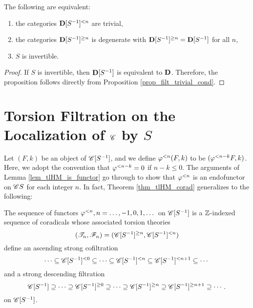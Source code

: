 \begin{prop}
The following are equivalent:
\begin{enumerate}
\item the categories $\Corad{n}{\DCatLoc{S}}$ are trivial,

\item the categories $\Prerad{n}{\DCatLoc{S}}$ is degenerate with
$\Prerad{n}{\DCatLoc{S}} = \DCatLoc{S}$ for all $n$,

\item $S$ is invertible.
\end{enumerate}
\end{prop}
\begin{proof}
If $S$ is invertible, then $\DCatLoc{S}$ is equivalent to $\DCat$.
Therefore, the proposition follows directly from Proposition
\ref{prop_filt_trivial_cond}.
\end{proof}

\section{Torsion Filtration on the Localization of $\Cat{C}$ by $S$}

Let $(F, k)$ be an object of $\CatLoc{C}{S}$, and we define
$\corad{n}(F, k)$ to be $(\corad{n - k}F, k)$. Here, we 
adopt the convention that $\corad{n - k} = 0$ if $n - k \leq 0$.
The arguments of Lemma \ref{lem_tlHM_is_functor} go through to
show that $\corad{n}$ is an endofunctor on $\Cat{C}{S}$ for each
integer $n$. In fact, Theorem \ref{thm_tlHM_corad} generalizes to
the following:

\begin{thm}
\label{thm_sum_heart_loc}
The sequence of functors $\corad{n}, n = \dots, -1, 0, 1, \dots$ on
$\CatLoc{C}{S}$ is a $\Z$-indexed sequence of coradicals whose 
associated torsion theories 
\[
(\Cat{T}_n, \Cat{F}_n) = (\Prerad{n}{\CatLoc{C}{S}}, \Corad{n}{\CatLoc{C}{S}})
\]
define an ascending strong cofiltration
\[
\cdots \subseteq \Corad{0}{\CatLoc{C}{S}} \subseteq \cdots \subseteq 
   \Corad{n}{\CatLoc{C}{S}} \subseteq \Corad{n + 1}{\CatLoc{C}{S}}
   \subseteq \cdots
\]
and a strong descending filtration
\[
\CatLoc{C}{S} \supseteq \cdots \supseteq \Prerad{0}{\CatLoc{C}{S}}
   \supseteq \cdots \supseteq \Prerad{n}{\CatLoc{C}{S}} \supseteq 
   \Prerad{n + 1}{\CatLoc{C}{S}} \supseteq \cdots.
\]
on $\CatLoc{C}{S}$.
\end{thm}

